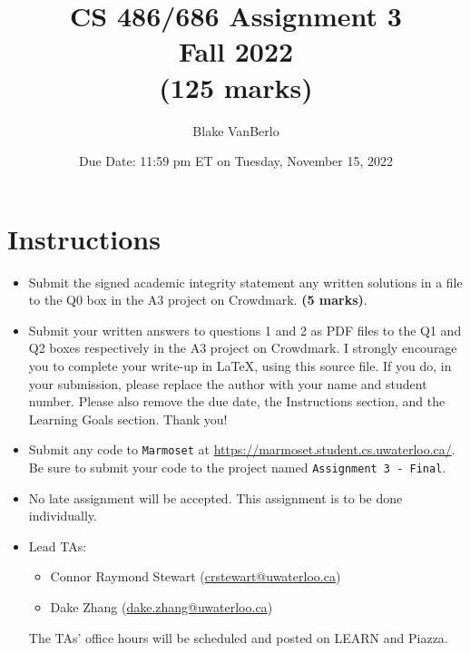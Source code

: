 \documentclass[12pt]{article}
\title{CS 486/686 Assignment 3 \\ Fall 2022 \\ (125 marks) }
\author{Blake VanBerlo}
\date{Due Date: 11:59 pm ET on Tuesday, November 15, 2022}
\begin{document}
\maketitle




\newpage

\newpage
\section*{Instructions}

\begin{itemize}
\item
Submit the signed academic integrity statement any written solutions in a file to the Q0 box in the A3 project on Crowdmark. \textbf{(5 marks)}.

\item Submit your written answers to questions 1 and 2 as PDF files to the Q1 and Q2 boxes respectively in the A3 project on Crowdmark. I strongly encourage you to complete your write-up in LaTeX, using this source file. If you do, in your submission, please replace the author with your name and student number. Please also remove the due date, the Instructions section, and the Learning Goals section. Thank you!

\item Submit any code to \verb+Marmoset+ at \url{https://marmoset.student.cs.uwaterloo.ca/}. Be sure to submit your code to the project named \texttt{Assignment 3 - Final}. 

\item
No late assignment will be accepted. This assignment is to be done individually.

\item
Lead TAs: 
\begin{itemize}
\item 
Connor Raymond Stewart (\url{crstewart@uwaterloo.ca})
\item
Dake Zhang (\url{dake.zhang@uwaterloo.ca})
\end{itemize}
The TAs' office hours will be scheduled and posted on LEARN and Piazza.
\end{itemize}
\end{document}
